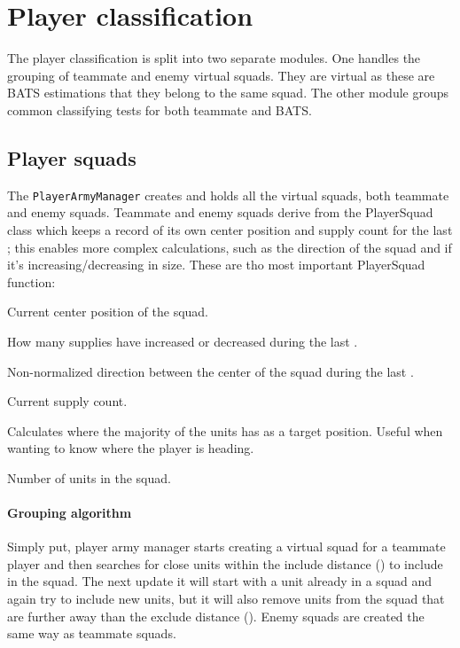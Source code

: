 \section{Player classification}
The player classification is split into two separate modules. One handles the grouping of teammate and enemy virtual squads. They are virtual as these are BATS estimations that they belong to the same squad. The other module groups common classifying tests for both teammate and BATS. 

\subsection{Player squads}
The \texttt{PlayerArmyManager} creates and holds all the virtual squads, both teammate and enemy squads. Teammate and enemy squads derive from the PlayerSquad class which keeps a record of its own center position and supply count for the last \classificationMeasureTimeTotal; this enables more complex calculations, such as the direction of the squad and if it's increasing/decreasing in size. These are tho most important PlayerSquad function:
\begin{function_description}
	\item[\texttt{TilePosition getCenter()}] Current center position of the squad.
	\item[\texttt{int getDeltaSupplyCount()}] How many supplies have increased or decreased during the last \classificationMeasureTimeTotal.
	\item[\texttt{TilePosition getDirection()}] Non-normalized direction between the center of the squad during the last \classificationMeasureTimeTotal.
	\item[\texttt{int getSupplyCount()}] Current supply count.
	\item[\texttt{TilePosition getTargetPosition()}] Calculates where the majority of the units has as a target position. Useful when wanting to know where the player is heading.
	\item[\texttt{int getUnitCount()}] Number of units in the squad.	
\end{function_description}

\paragraph{Grouping algorithm}
Simply put, player army manager starts creating a virtual squad for a teammate player and then searches for close units within the include distance (\classificationSquadIncludeDistance) to include in the squad. The next update it will start with a unit already in a squad and again try to include new units, but it will also remove units from the squad that are further away than the exclude distance (\classificationSquadExcludeDistance). Enemy squads are created the same way as teammate squads.

